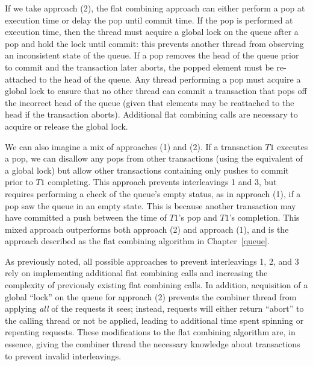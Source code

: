 If we take approach (2), the flat combining approach can either perform a pop at execution time or delay the pop until commit time. If the pop is performed at execution time, then the thread must acquire a global lock on the queue after a pop and hold the lock until commit: this prevents another thread from observing an inconsistent state of the queue. If a pop removes the head of the queue prior to commit and the transaction later aborts, the popped element must be re-attached to the head of the queue. Any thread performing a pop must acquire a global lock to ensure that no other thread can commit a transaction that pops off the incorrect head of the queue (given that elements may be reattached to the head if the transaction aborts). Additional flat combining calls are necessary to acquire or release the global lock. 

We can also imagine a mix of approaches (1) and (2). If a transaction $T1$ executes a pop, we can disallow any pops from other transactions (using the equivalent of a global lock) but allow other transactions containing only pushes to commit prior to $T1$ completing. This approach prevents interleavings 1 and 3, but requires performing a check of the queue's empty status, as in approach (1), if a pop saw the queue in an empty state. This is because another transaction may have committed a push between the time of $T1$'s pop and $T1$'s completion. This mixed approach outperforms both approach (2) and approach (1), and is the approach described as the flat combining algorithm in Chapter~\ref{queue}. 

As previously noted, all possible approaches to prevent interleavings 1, 2, and 3 rely on implementing additional flat combining calls and increasing the complexity of previously existing flat combining calls. In addition, acquisition of a global ``lock'' on the queue for approach (2) prevents the combiner thread from applying \emph{all} of the requests it sees; instead, requests will either return ``abort'' to the calling thread or not be applied, leading to additional time spent spinning or repeating requests. These modifications to the flat combining algorithm are, in essence, giving the combiner thread the necessary knowledge about transactions to prevent invalid interleavings.

